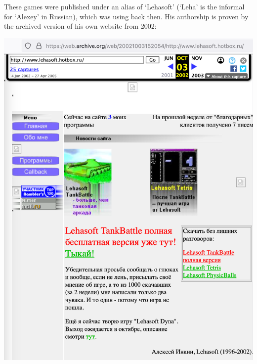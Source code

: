 These games were published under an alias of `Lehasoft'
(`Leha' is the informal for `Alexey' in Russian),
which \mrl was using back then.
His authorship is proven by the archived version of his own website from 2002:



\begin{center}
    \includegraphics[width=\textwidth]{lehasoft-hotbox}
\end{center}

\pagebreak
